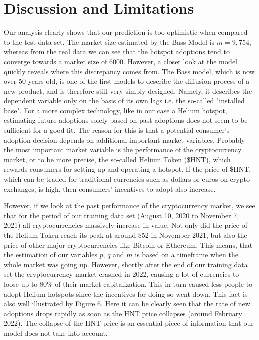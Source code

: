 \documentclass{article}
\begin{document}

\section{Discussion and Limitations}

Our analysis clearly shows that our prediction is too optimistic when compared to the test data set. The market size estimated by the Bass Model is $m = 9,754$, whereas
from the real data we can see that the hotspot adoptions tend to converge towards a market size of $6000$. However, a closer look at the model quickly reveals where
this discrepancy comes from. The Bass model, which is now over 50 years old, is one of the first models to describe the diffusion process of a new product, and is
therefore still very simply designed. Namely, it describes the dependent variable only on the basis of its own lags i.e. the so-called "installed base". For a more
complex technology, like in our case a Helium hotspot, estimating future adoptions solely based on past adoptions does not seem to be sufficient for a good fit.
The reason for this is that a potential consumer's adoption decision depends on additional important market variables. Probably the most important market variable
is the performance of the cryptocurrency market, or to be more precise, the so-called Helium Token (\$HNT), which rewards consumers for setting up and operating a
hotspot. If the price of \$HNT, which can be traded for traditional currencies such as dollars or euros on crypto exchanges, is high, then consumers'
incentives to adopt also increase. 

\bigskip

\noindent However, if we look at the past performance of the cryptocurrency market, we see that for the period of our training data set (August 10, 2020 to November 7, 2021) all
cryptocurrencies massively increase in value. Not only did the price of the Helium Token reach its peak at around \$52 in November 2021, but also the price of other major
cryptocurrencies like Bitcoin or Ethereum. This means, that the estimation of our variables $p$, $q$ and $m$ is based on a timeframe when the whole market was going up. However,
shortly after the end of our training data set the cryptocurrency market crashed in 2022, causing a lot of currencies to loose up to 80\% of their market capitalization. This in
turn caused less people to adopt Helium hotspots since the incentives for doing so went down. This fact is also well illustrated by Figure 6. Here it can be clearly seen that the
rate of new adoptions drops rapidly as soon as the HNT price collapses (around February 2022). The collapse of the HNT price is an essential piece of information that our model
does not take into account.
\end{document}
